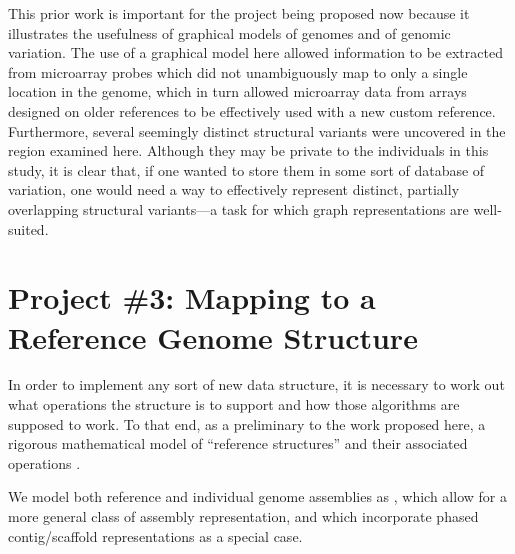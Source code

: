 \documentclass[11pt,proposal]{ucthesis}
\begin{document}
This prior work is important for the project being proposed now because it illustrates the usefulness of graphical models of genomes and of genomic variation. The use of a graphical model here allowed information to be extracted from microarray probes which did not unambiguously map to only a single location in the genome, which in turn allowed microarray data from arrays designed on older references to be effectively used with a new custom reference. Furthermore, several seemingly distinct structural variants were uncovered in the region examined here. Although they may be private to the individuals in this study, it is clear that, if one wanted to store them in some sort of database of variation, one would need a way to effectively represent distinct, partially overlapping structural variants---a task for which graph representations are well-suited.



    
    
        
    


\section{Project \#3: Mapping to a Reference Genome Structure}

In order to implement any sort of new data structure, it is necessary to work out what operations the structure is to support and how those algorithms are supposed to work. To that end, as a preliminary to the work proposed here, a rigorous mathematical model of ``reference structures'' and their associated operations \cite{paten2014mapping}. 


We model both reference and individual genome assemblies as , which allow for a more general class of assembly representation, and which incorporate phased contig/scaffold representations as a special case. 
\end{document}
